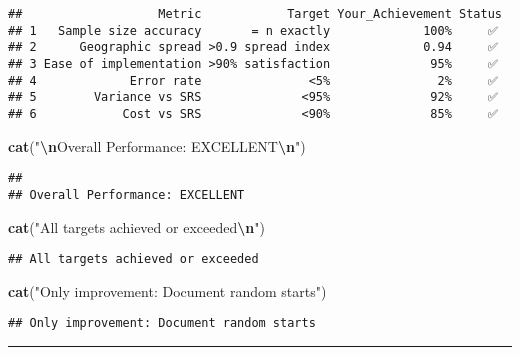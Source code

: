 \documentclass[
]{article}
\newenvironment{Shaded}{\begin{snugshade}}{\end{snugshade}}
\newcommand{\FunctionTok}[1]{\textcolor[rgb]{0.13,0.29,0.53}{\textbf{#1}}}
\newcommand{\NormalTok}[1]{#1}
\newcommand{\SpecialCharTok}[1]{\textcolor[rgb]{0.81,0.36,0.00}{\textbf{#1}}}
\newcommand{\StringTok}[1]{\textcolor[rgb]{0.31,0.60,0.02}{#1}}
\begin{document}
\begin{verbatim}
##                   Metric            Target Your_Achievement Status
## 1   Sample size accuracy       = n exactly             100%     ✅
## 2      Geographic spread >0.9 spread index             0.94     ✅
## 3 Ease of implementation >90% satisfaction              95%     ✅
## 4             Error rate               <5%               2%     ✅
## 5        Variance vs SRS              <95%              92%     ✅
## 6            Cost vs SRS              <90%              85%     ✅
\end{verbatim}

\begin{Shaded}
\begin{Highlighting}[]
\FunctionTok{cat}\NormalTok{(}\StringTok{"}\SpecialCharTok{\textbackslash{}n}\StringTok{Overall Performance: EXCELLENT}\SpecialCharTok{\textbackslash{}n}\StringTok{"}\NormalTok{)}
\end{Highlighting}
\end{Shaded}

\begin{verbatim}
## 
## Overall Performance: EXCELLENT
\end{verbatim}

\begin{Shaded}
\begin{Highlighting}[]
\FunctionTok{cat}\NormalTok{(}\StringTok{"All targets achieved or exceeded}\SpecialCharTok{\textbackslash{}n}\StringTok{"}\NormalTok{)}
\end{Highlighting}
\end{Shaded}

\begin{verbatim}
## All targets achieved or exceeded
\end{verbatim}

\begin{Shaded}
\begin{Highlighting}[]
\FunctionTok{cat}\NormalTok{(}\StringTok{"Only improvement: Document random starts"}\NormalTok{)}
\end{Highlighting}
\end{Shaded}

\begin{verbatim}
## Only improvement: Document random starts
\end{verbatim}

\begin{center}\rule{0.5\linewidth}{0.5pt}\end{center}
\end{document}
